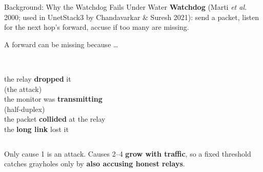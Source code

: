 \documentclass[aspectratio=169,11pt]{beamer}
\begin{document}
\begin{frame}{Background: Why the Watchdog Fails Under Water}
  \textbf{Watchdog} (Marti \emph{et al.} 2000; used in UnetStack3 by Chandavarkar \& Suresh 2021):
  send a packet, listen for the next hop's forward, accuse if too many are missing.

  \vspace{0.8em}
  \begin{block}{A forward can be missing because \dots}
    \begin{columns}[t]
      \\\small the relay \textbf{dropped} it\\{\scriptsize\color{gray}(the attack)}
      \\\small the monitor was \textbf{transmitting}\\{\scriptsize\color{gray}(half-duplex)}
      \\\small the packet \textbf{collided} at the relay
      \\\small the \textbf{long link} lost it
    \end{columns}
    \vspace{0.3em}
  \end{block}

  \vspace{0.5em}
  \centering
  Only cause 1 is an attack. Causes 2--4 \textbf{grow with traffic}, so a fixed threshold\\
  catches grayholes only by \textcolor{bad}{\textbf{also accusing honest relays}}.
\end{frame}
\end{document}
